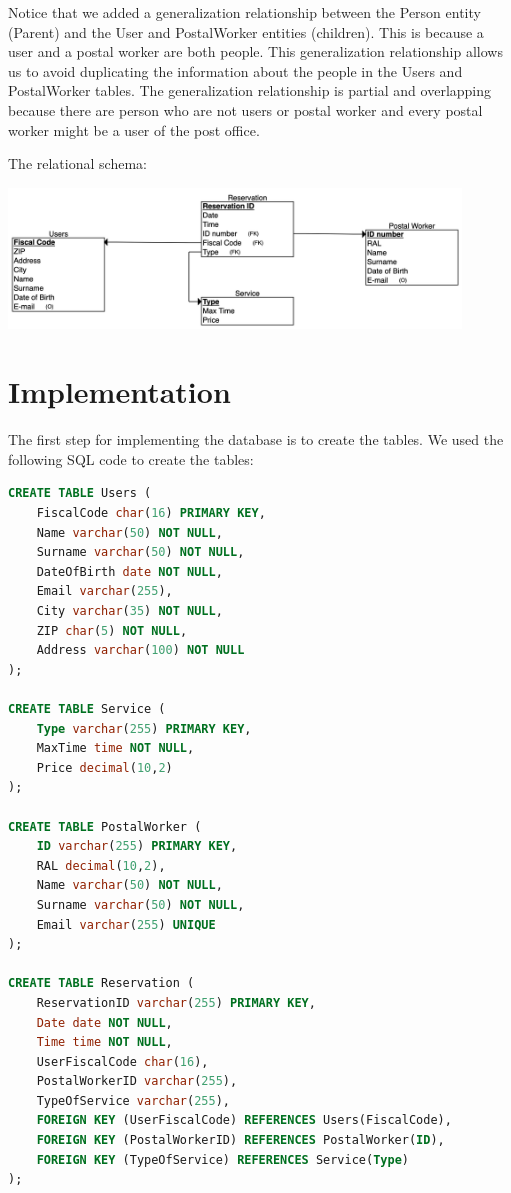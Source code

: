 \documentclass{article}
\begin{document}
Notice that we added a generalization relationship between the Person entity (Parent) and the User and PostalWorker entities (children). This is because a user and a postal worker are both people. This generalization relationship allows us to avoid duplicating the information about the people in the Users and PostalWorker tables. The generalization relationship is partial and overlapping because there are person who are not users or postal worker and every postal worker might be a user of the post office.

The relational schema:
\begin{center}
\includegraphics[width=12cm]{images/relationalSchema.png}
\end{center}

\section{Implementation}
The first step for implementing the database is to create the tables. We used the following SQL code to create the tables:

\begin{lstlisting}[language=SQL]
CREATE TABLE Users (
    FiscalCode char(16) PRIMARY KEY,
    Name varchar(50) NOT NULL,
    Surname varchar(50) NOT NULL,
    DateOfBirth date NOT NULL,
    Email varchar(255),
    City varchar(35) NOT NULL,
    ZIP char(5) NOT NULL,
    Address varchar(100) NOT NULL
);

CREATE TABLE Service (
    Type varchar(255) PRIMARY KEY,
    MaxTime time NOT NULL,
    Price decimal(10,2)
);

CREATE TABLE PostalWorker (
    ID varchar(255) PRIMARY KEY,
    RAL decimal(10,2),
    Name varchar(50) NOT NULL,
    Surname varchar(50) NOT NULL,
    Email varchar(255) UNIQUE
);

CREATE TABLE Reservation (
    ReservationID varchar(255) PRIMARY KEY,
    Date date NOT NULL,
    Time time NOT NULL,
    UserFiscalCode char(16),
    PostalWorkerID varchar(255),
    TypeOfService varchar(255),
    FOREIGN KEY (UserFiscalCode) REFERENCES Users(FiscalCode),
    FOREIGN KEY (PostalWorkerID) REFERENCES PostalWorker(ID),
    FOREIGN KEY (TypeOfService) REFERENCES Service(Type)
);
\end{lstlisting}
\end{document}
